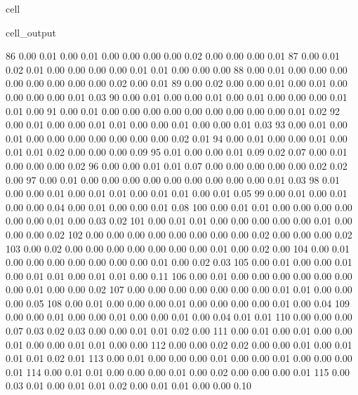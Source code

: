 \documentclass[letterpaper,10pt,french]{sphinxmanual}
\begin{document}
\begin{sphinxuseclass}{cell}
\begin{sphinxuseclass}{cell_output}
\begin{sphinxVerbatim}[commandchars=\\\{\}]
        86	0.00 	0.01 	0.00 	0.01 	0.00 	0.00 	0.00 	0.00 	0.02 	0.00 	0.00 	0.00 	0.01
        87	0.00 	0.01 	0.02 	0.01 	0.00 	0.00 	0.00 	0.00 	0.01 	0.01 	0.00 	0.00 	0.00
        88	0.00 	0.01 	0.00 	0.00 	0.00 	0.00 	0.00 	0.00 	0.00 	0.00 	0.02 	0.00 	0.01
        89	0.00 	0.02 	0.00 	0.00 	0.01 	0.00 	0.01 	0.00 	0.00 	0.00 	0.00 	0.01 	0.03
        90	0.00 	0.01 	0.00 	0.00 	0.01 	0.00 	0.01 	0.00 	0.00 	0.00 	0.01 	0.01 	0.00
        91	0.00 	0.01 	0.00 	0.00 	0.00 	0.00 	0.00 	0.00 	0.00 	0.00 	0.00 	0.01 	0.02
        92	0.00 	0.01 	0.00 	0.00 	0.01 	0.01 	0.00 	0.00 	0.01 	0.00 	0.00 	0.01 	0.03
        93	0.00 	0.01 	0.00 	0.01 	0.00 	0.00 	0.00 	0.00 	0.00 	0.00 	0.00 	0.02 	0.01
        94	0.00 	0.01 	0.00 	0.00 	0.01 	0.00 	0.01 	0.01 	0.02 	0.00 	0.00 	0.00 	0.09
        95	0.01 	0.00 	0.00 	0.01 	0.09 	0.02 	0.07 	0.00 	0.01 	0.00 	0.00 	0.00 	0.02
        96	0.00 	0.00 	0.01 	0.01 	0.07 	0.00 	0.00 	0.00 	0.00 	0.00 	0.02 	0.02 	0.00
        97	0.00 	0.01 	0.00 	0.00 	0.00 	0.00 	0.00 	0.00 	0.00 	0.00 	0.00 	0.01 	0.03
        98	0.01 	0.00 	0.00 	0.01 	0.00 	0.01 	0.01 	0.00 	0.01 	0.01 	0.00 	0.01 	0.05
        99	0.00 	0.01 	0.00 	0.01 	0.00 	0.00 	0.04 	0.00 	0.01 	0.00 	0.00 	0.01 	0.08
       100	0.00 	0.01 	0.01 	0.00 	0.00 	0.00 	0.00 	0.00 	0.00 	0.01 	0.00 	0.03 	0.02
       101	0.00 	0.01 	0.01 	0.00 	0.00 	0.00 	0.00 	0.00 	0.01 	0.00 	0.00 	0.00 	0.02
       102	0.00 	0.00 	0.00 	0.00 	0.00 	0.00 	0.00 	0.00 	0.02 	0.00 	0.00 	0.00 	0.02
       103	0.00 	0.02 	0.00 	0.00 	0.00 	0.00 	0.00 	0.00 	0.00 	0.01 	0.00 	0.02 	0.00
       104	0.00 	0.01 	0.00 	0.00 	0.00 	0.00 	0.00 	0.00 	0.00 	0.01 	0.00 	0.02 	0.03
       105	0.00 	0.01 	0.00 	0.00 	0.01 	0.00 	0.01 	0.01 	0.00 	0.01 	0.01 	0.00 	0.11
       106	0.00 	0.01 	0.00 	0.00 	0.00 	0.00 	0.00 	0.00 	0.00 	0.01 	0.00 	0.00 	0.02
       107	0.00 	0.00 	0.00 	0.00 	0.00 	0.00 	0.00 	0.01 	0.01 	0.00 	0.00 	0.00 	0.05
       108	0.00 	0.01 	0.00 	0.00 	0.00 	0.01 	0.00 	0.00 	0.00 	0.00 	0.01 	0.00 	0.04
       109	0.00 	0.00 	0.01 	0.00 	0.00 	0.01 	0.00 	0.00 	0.01 	0.00 	0.04 	0.01 	0.01
       110	0.00 	0.00 	0.00 	0.07 	0.03 	0.02 	0.03 	0.00 	0.00 	0.01 	0.01 	0.02 	0.00
       111	0.00 	0.01 	0.00 	0.01 	0.00 	0.00 	0.01 	0.00 	0.00 	0.01 	0.01 	0.00 	0.00
       112	0.00 	0.00 	0.02 	0.02 	0.00 	0.00 	0.01 	0.00 	0.01 	0.01 	0.01 	0.02 	0.01
       113	0.00 	0.01 	0.00 	0.00 	0.00 	0.01 	0.00 	0.00 	0.01 	0.00 	0.00 	0.00 	0.01
       114	0.00 	0.01 	0.01 	0.00 	0.00 	0.00 	0.01 	0.00 	0.02 	0.00 	0.00 	0.00 	0.01
       115	0.00 	0.03 	0.01 	0.00 	0.01 	0.01 	0.02 	0.00 	0.01 	0.01 	0.00 	0.00 	0.10

\end{sphinxVerbatim}
\end{sphinxuseclass}
\end{sphinxuseclass}
\end{document}
